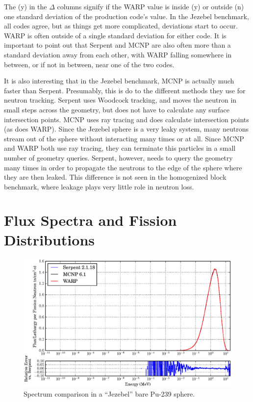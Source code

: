 The (y) in the $\Delta$ columns signify if the WARP value is inside (y) or outside (n) one standard deviation of the production code's value.  In the Jezebel benchmark, all codes agree, but as things get more complicated, deviations start to occur.  WARP is often outside of a single standard deviation for either code.  It is important to point out that Serpent and MCNP are also often more than a standard deviation away from each other, with WARP falling somewhere in between, or if not in between, near one of the two codes.

It is also interesting that in the Jezebel benchmark, MCNP is actually much faster than Serpent.  Presumably, this is do to the different methods they use for neutron tracking.  Serpent uses Woodcock tracking, and moves the neutron in small steps across the geometry, but does not have to calculate any surface intersection points.  MCNP uses ray tracing and does calculate intersection points (as does WARP).  Since the Jezebel sphere is a very leaky system, many neutrons stream out of the sphere without interacting many times or at all.  Since  MCNP and WARP both use ray tracing, they can terminate this particles in a small number of geometry queries.  Serpent, however, needs to query the geometry many times in order to propagate the neutrons to the edge of the sphere where they are then leaked.  This difference is not seen in the homogenized block benchmark, where leakage plays very little role in neutron loss.

\section{Flux Spectra and Fission Distributions}

\begin{figure}[h!] 
\centering
\includegraphics[width=\textwidth,trim= 1cm 0cm 1cm 0cm]{graphics/finalresults/godiva_spec-6.eps}
\caption{Spectrum comparison in a ``Jezebel'' bare Pu-239 sphere. \label{godiva_spec} }
\end{figure}

